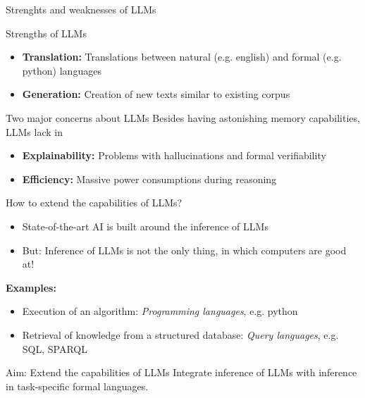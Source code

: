 \documentclass{beamer}
\begin{document}
    \begin{frame}{Strenghts and weaknesses of LLMs}
        \begin{block}{Strengths of LLMs}
            \begin{itemize}
                \item \textbf{Translation:} Translations between natural (e.g. english) and formal (e.g. python) languages
                \item \textbf{Generation:} Creation of new texts similar to existing corpus
            \end{itemize}
        \end{block}

        \begin{block}{Two major concerns about LLMs}
            Besides having astonishing memory capabilities, LLMs lack in
            \begin{itemize}
                \item \textbf{Explainability:} Problems with hallucinations and formal verifiability
                \item \textbf{Efficiency:} Massive power consumptions during reasoning
            \end{itemize}
        \end{block}
    \end{frame}

    \begin{frame}{How to extend the capabilities of LLMs?}
        \begin{itemize}
            \item State-of-the-art AI is built around the inference of LLMs
            \item But: Inference of LLMs is not the only thing, in which computers are good at!
        \end{itemize}

            {\bf Examples:}
        \begin{itemize}
            \item Execution of an algorithm: \emph{Programming languages}, e.g. python
            \item Retrieval of knowledge from a structured database: \emph{Query languages}, e.g. SQL, SPARQL
        \end{itemize}

        \begin{block}{Aim: Extend the capabilities of LLMs}
            Integrate inference of LLMs with inference in task-specific formal languages.
        \end{block}
    \end{frame}
\end{document}
